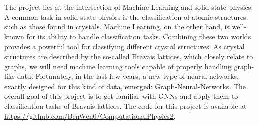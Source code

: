 The project lies at the intersection of Machine Learning and solid-state physics. 
A common task in solid-state physics is the classification of atomic structures, such as those found in crystals.
Machine Learning, on the other hand, is well-known for its ability to handle classification tasks. Combining these two worlds provides a powerful tool for 
classifying different crystal structures. 
As crystal structures are described by the so-called Bravais lattices, which closely relate to graphs, we will need machine learning tools capable of properly handling graph-like data.
Fortunately, in the last few years, a new type of neural networks, exactly designed for this kind of data, emerged: Graph-Neural-Networks.
The overall goal of this project is to get familiar with GNNs and apply them to classification tasks of Bravais lattices.
The code for this project is available at \url{https://github.com/BenWen0/ComputationalPhysics2}.